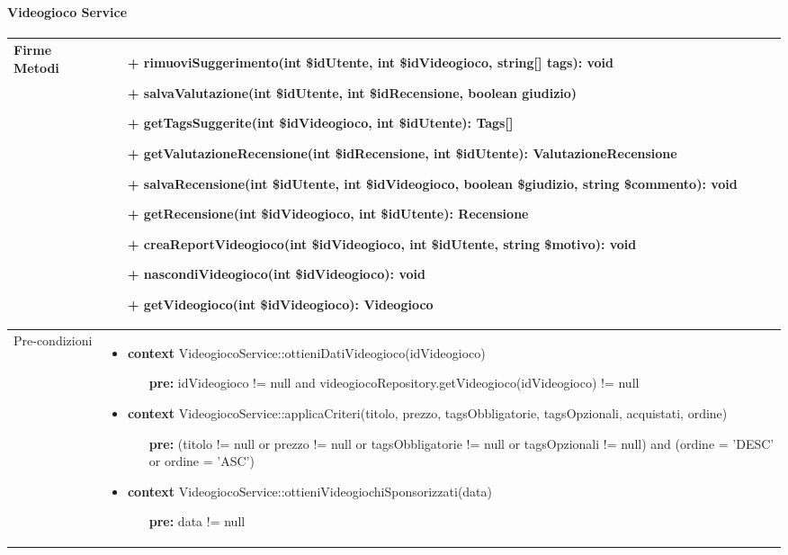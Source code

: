 \paragraph{Videogioco Service}
\small\begin{tabular}{|| l | p{28em} ||} 
	\hline
	Firme Metodi & \begin{itemize}
		\item[+] rimuoviSuggerimento(int \$idUtente, int \$idVideogioco, string[] tags): void
		\item[+] salvaValutazione(int \$idUtente, int \$idRecensione, boolean giudizio)
		\item[+] getTagsSuggerite(int \$idVideogioco, int \$idUtente): Tags[] 
		\item[+] getValutazioneRecensione(int \$idRecensione, int \$idUtente): ValutazioneRecensione
		\item[+] salvaRecensione(int \$idUtente, int \$idVideogioco, boolean \$giudizio, string \$commento): void
		\item[+] getRecensione(int \$idVideogioco, int \$idUtente): Recensione
		\item[+] creaReportVideogioco(int \$idVideogioco, int \$idUtente, string \$motivo): void
		\item[+] nascondiVideogioco(int \$idVideogioco): void
		\item[+] getVideogioco(int \$idVideogioco): Videogioco  
	\end{itemize}\\
	\hline
	Pre-condizioni & \begin{itemize}[leftmargin=*]
		\item \textbf{context} VideogiocoService::ottieniDatiVideogioco(idVideogioco)
		\begin{itemize}
			\item[ ] \textbf{pre:} idVideogioco != null and videogiocoRepository.getVideogioco(idVideogioco) != null
		\end{itemize}

		\item \textbf{context} VideogiocoService::applicaCriteri(titolo, prezzo, tagsObbligatorie, tagsOpzionali, acquistati, ordine)
		\begin{itemize}
			\item[ ] \textbf{pre:} (titolo != null or prezzo != null or tagsObbligatorie != null or tagsOpzionali != null) and (ordine = 'DESC' or ordine = 'ASC')
		\end{itemize}

		\item \textbf{context} VideogiocoService::ottieniVideogiochiSponsorizzati(data)
		\begin{itemize}
			\item[ ] \textbf{pre:} data != null
		\end{itemize}


\end{itemize}
\end{tabular}
